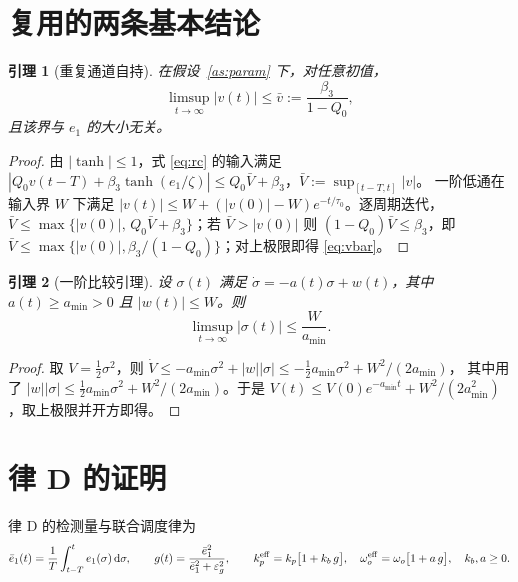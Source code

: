 \documentclass[11pt,a4paper]{article}
\newtheorem{lemma}{引理}
\theoremstyle{remark}
\newcommand{\st}{\operatorname{tanh}}
\begin{document}
\section{复用的两条基本结论}
\begin{lemma}[重复通道自持]\label{lem:v}
在假设~\ref{as:param} 下，对任意初值，
\begin{equation}
\limsup_{t\to\infty}|v(t)|\le \bar v:=\frac{\beta_3}{1-Q_0},
\label{eq:vbar}
\end{equation}
且该界与 $e_1$ 的大小无关。
\end{lemma}
\begin{proof}
由 $|\st|\le1$，式 \eqref{eq:rc} 的输入满足 $|Q_0v(t-T)+\beta_3\st(e_1/\zeta)|\le Q_0\bar V+\beta_3$，$\bar V:=\sup_{[t-T,t]}|v|$。
一阶低通在输入界 $W$ 下满足 $|v(t)|\le W+(|v(0)|-W)e^{-t/\tau_0}$。逐周期迭代，
$\bar V\le \max\{|v(0)|,\,Q_0\bar V+\beta_3\}$；若 $\bar V>|v(0)|$ 则 $(1-Q_0)\bar V\le\beta_3$，即
$\bar V\le\max\{|v(0)|,\beta_3/(1-Q_0)\}$；对上极限即得 \eqref{eq:vbar}。
\end{proof}

\begin{lemma}[一阶比较引理]\label{lem:cmp}
设 $\sigma(t)$ 满足 $\dot\sigma=-a(t)\sigma+w(t)$，其中 $a(t)\ge a_{\min}>0$ 且 $|w(t)|\le W$。则
\begin{equation}
\limsup_{t\to\infty}|\sigma(t)|\le\frac{W}{a_{\min}}.
\label{eq:cmp}
\end{equation}
\end{lemma}
\begin{proof}
取 $V=\tfrac12\sigma^2$，则 $\dot V\le -a_{\min}\sigma^2+|w||\sigma|\le-\tfrac12 a_{\min}\sigma^2+W^2/(2a_{\min})$，
其中用了 $|w||\sigma|\le\tfrac12 a_{\min}\sigma^2+W^2/(2a_{\min})$。于是 $V(t)\le V(0)e^{-a_{\min}t}+W^2/(2a_{\min}^2)$，取上极限并开方即得。
\end{proof}

\section{律 D 的证明}\label{sec:lawd}
律 D 的检测量与联合调度律为
\begin{equation}
\bar e_1(t)=\frac1T\int_{t-T}^{t}e_1(\sigma)\,\mathrm d\sigma,\qquad
g(t)=\frac{\bar e_1^2}{\bar e_1^2+\varepsilon_g^2},\qquad
k_p^{\rm eff}=k_p\bigl[1+k_b\,g\bigr],\quad
\omega_o^{\rm eff}=\omega_o\bigl[1+a\,g\bigr],\quad k_b,a\ge0 .
\label{eq:lawd}
\end{equation}
\end{document}
